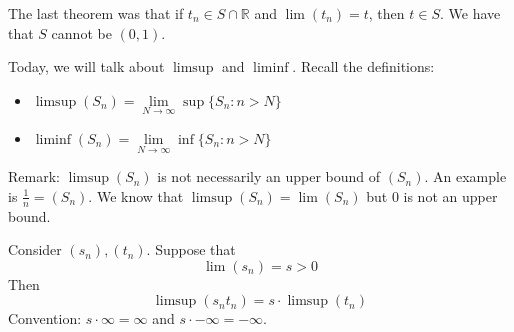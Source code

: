 \documentclass{report}
\begin{document}
The last theorem was that if $t_{n} \in S \cap \mathbb{R}$ and $\lim (t_{n}) = t$, then $t \in S$. We have that $S$ cannot be $(0, 1)$.

Today, we will talk about $\limsup $ and $\liminf $. Recall the definitions:
    \begin{itemize}
        \item $\limsup (S_{n}) = \lim\limits_{N \to \infty} \sup \{S_{n} : n > N\}$

        \item $\liminf (S_{n}) = \lim\limits_{N \to \infty} \inf \{S_{n} : n > N\}$ 
    \end{itemize}

Remark: $\limsup (S_{n})$ is not necessarily an upper bound of $(S_{n})$. An example is $\frac{1}{n} = (S_{n})$. We know that $\limsup (S_{n}) = \lim (S_{n})$ but $0$ is not an upper bound.

\begin{theorem}{12.1}
    Consider $(s_{n}), (t_{n})$. Suppose that
        \begin{equation*}
            \lim (s_{n}) = s > 0
        \end{equation*}
    Then 
        \begin{equation*}
            \limsup (s_{n}t_{n}) = s \cdot \limsup (t_{n})
        \end{equation*}
    Convention: $s \cdot \infty = \infty$ and $s \cdot -\infty = -\infty$.
\end{theorem}
\end{document}
